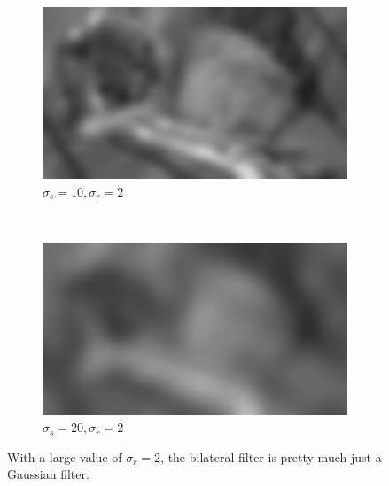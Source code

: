 \documentclass[a4spaper]{article}
\begin{document}
\begin{figure}[ht]
	\vspace{2mm}
	\begin{subfigure}[h]{0.48\textwidth}
		\centering
		\includegraphics[width=\textwidth]{jerry_flt_10_2}
		\caption*{$\sigma_s = 10, \sigma_r = 2$}
	\end{subfigure}
	~ 
	\begin{subfigure}[h]{0.48\textwidth}
		\centering
		\includegraphics[width=\textwidth]{jerry_flt_20_2}
		\caption*{$\sigma_s = 20, \sigma_r = 2$}
	\end{subfigure}
\caption{With a large value of $\sigma_r = 2$, the bilateral filter is pretty much just a Gaussian filter.}
\label{fig:jerry_large_range}
\end{figure}
\end{document}
